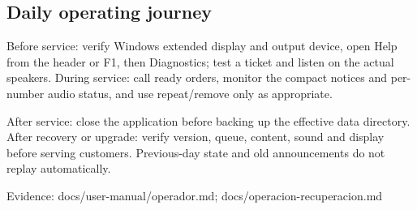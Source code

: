 \subsection{Daily operating journey}

Before service: verify Windows extended display and output device, open Help from the header or F1, then Diagnostics; test a ticket and listen on the actual speakers. During service: call ready orders, monitor the compact notices and per-number audio status, and use repeat/remove only as appropriate.

After service: close the application before backing up the effective data directory. After recovery or upgrade: verify version, queue, content, sound and display before serving customers. Previous-day state and old announcements do not replay automatically.

Evidence: docs/user-manual/operador.md; docs/operacion-recuperacion.md
